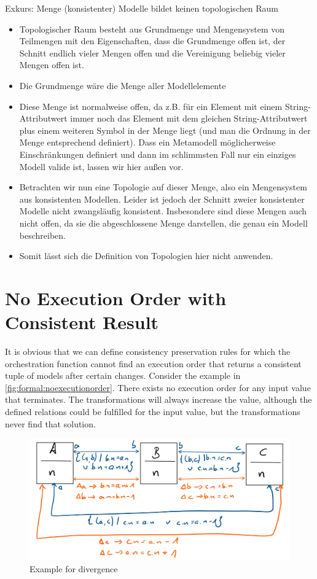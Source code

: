 Exkurs: Menge (konsistenter) Modelle bildet keinen topologischen Raum
\begin{itemize}
    \item Topologischer Raum besteht aus Grundmenge und Mengensystem von Teilmengen mit den Eigenschaften, dass die Grundmenge offen ist, der Schnitt endlich vieler Mengen offen und die Vereinigung beliebig vieler Mengen offen ist. 
    \item Die Grundmenge wäre die Menge aller Modellelemente
    \item Diese Menge ist normalweise offen, da z.B. für ein Element mit einem String-Attributwert immer noch das Element mit dem gleichen String-Attributwert plus einem weiteren Symbol in der Menge liegt (und man die Ordnung in der Menge entsprechend definiert). Dass ein Metamodell möglicherweise Einschränkungen definiert und dann im schlimmsten Fall nur ein einziges Modell valide ist, lassen wir hier außen vor.
    \item Betrachten wir nun eine Topologie auf dieser Menge, also ein Mengensystem aus konsistenten Modellen. Leider ist jedoch der Schnitt zweier konsistenter Modelle nicht zwangsläufig konsistent. Insbesondere sind diese Mengen auch nicht offen, da sie die abgeschlossene Menge darstellen, die genau ein Modell beschreiben. 
    \item Somit lässt sich die Definition von Topologien hier nicht anwenden.
\end{itemize}



\section{No Execution Order with Consistent Result}

It is obvious that we can define consistency preservation rules for which the orchestration function cannot find an execution order that returns a consistent tuple of models after certain changes. Consider the example in \autoref{fig:formal:noexecutionorder}. There exists no execution order for any input value that terminates. The transformations will always increase the value, although the defined relations could be fulfilled for the input value, but the transformations never find that solution.

\begin{figure}
    \centering
    \includegraphics[width=\textwidth]{figures/correctness/formal/divergence_example.png}
    \caption{Example for divergence}
    \label{fig:formal:noexecutionorder}
\end{figure}

